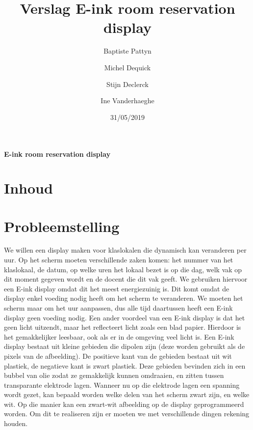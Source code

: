 \documentclass[a4paper,kul]{kulakarticle} %
\date{31/05/2019}
\title{Verslag E-ink room reservation display}
\author{Baptiste Pattyn\and Michel Dequick \and Stijn Declerck \and Ine Vanderhaeghe}
\begin{document}
\maketitle

\begin{center}
	\centering
	\vspace*{\fill}
	\huge
	\textbf{E-ink room reservation display}
	\vspace*{\fill}
\end{center}

\newpage

\section{Inhoud}

\tableofcontents

\newpage

\section{Probleemstelling}

We willen een display maken voor klaslokalen die dynamisch kan veranderen per uur. 
Op het scherm moeten verschillende zaken komen: het nummer van het klaslokaal, de datum, op welke uren het lokaal bezet is op die dag, welk vak op dit moment gegeven wordt en de docent die dit vak geeft. 
\newline
\newline
We gebruiken hiervoor een E-ink display omdat dit het meest energiezuinig is. Dit komt omdat de display enkel voeding nodig heeft om het scherm te veranderen. We moeten het scherm maar om het uur aanpassen, dus alle tijd daartussen heeft een E-ink display geen voeding nodig.
Een ander voordeel van een E-ink display is dat het geen licht uitzendt, maar het reflecteert licht zoals een blad papier. Hierdoor is het gemakkelijker leesbaar, ook als er in de omgeving veel licht is. 
\newline
Een E-ink display bestaat uit kleine gebieden die dipolen zijn (deze worden gebruikt als de pixels van de afbeelding). De positieve kant van de gebieden bestaat uit wit plastiek, de negatieve kant is zwart plastiek. Deze gebieden bevinden zich in een bubbel van olie zodat ze gemakkelijk kunnen omdraaien, en zitten tussen transparante elektrode lagen. Wanneer nu op die elektrode lagen een spanning wordt gezet, kan bepaald worden welke delen van het scherm zwart zijn, en welke wit. Op die manier kan een zwart-wit afbeelding op de display geprogrammeerd worden.
\newline
\newline
Om dit te realiseren zijn er moeten we met verschillende dingen rekening houden. 
\end{document}
